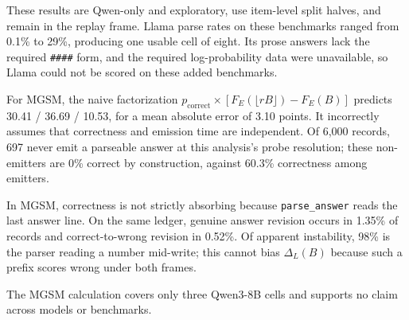 \documentclass[11pt]{article}
\begin{document}
These results are Qwen-only and exploratory, use item-level split halves, and
remain in the replay frame. Llama parse rates on these benchmarks ranged from
0.1\% to 29\%, producing one usable cell of eight. Its prose answers lack the
required \texttt{\#\#\#\#} form, and the required log-probability data were
unavailable, so Llama could not be scored on these added benchmarks.

For MGSM, the naive factorization
\(p_{\mathrm{correct}}\times[F_E(\lfloor rB\rfloor)-F_E(B)]\) predicts
30.41 / 36.69 / 10.53, for a mean absolute error of 3.10 points. It
incorrectly assumes that correctness and emission time are independent. Of 6,000 records, 697 never emit a parseable answer at this analysis's probe resolution; these non-emitters are 0\% correct by construction, against 60.3\% correctness among emitters.

In MGSM, correctness is not strictly absorbing because \texttt{parse\_answer} reads the
last answer line. On the same ledger, genuine answer revision occurs in
1.35\% of records and correct-to-wrong revision in 0.52\%. Of apparent
instability, 98\% is the parser reading a number mid-write; this cannot bias
\(\Delta_L(B)\) because such a prefix scores wrong under both frames.

The MGSM calculation covers only three Qwen3-8B cells and supports no claim
across models or benchmarks.
\end{document}
